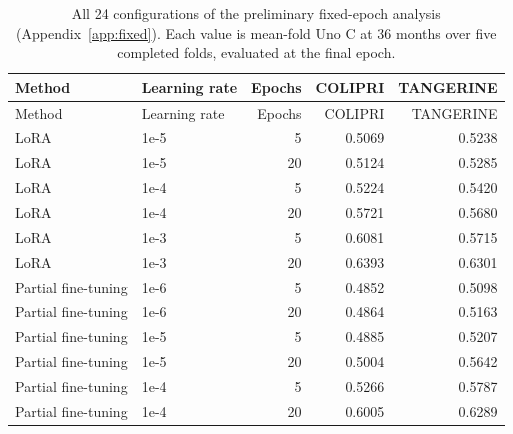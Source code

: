 \begin{longtable}{llrrr}
\caption{All 24 configurations of the preliminary fixed-epoch analysis (Appendix~\ref{app:fixed}). Each value is mean-fold Uno C at 36 months over five completed folds, evaluated at the final epoch.}\label{tab:phase3}\\
\toprule Method & Learning rate & Epochs & COLIPRI & TANGERINE \\ \midrule
\endfirsthead
\toprule Method & Learning rate & Epochs & COLIPRI & TANGERINE \\ \midrule
\endhead
LoRA & 1e-5 & 5 & 0.5069 & 0.5238 \\
LoRA & 1e-5 & 20 & 0.5124 & 0.5285 \\
LoRA & 1e-4 & 5 & 0.5224 & 0.5420 \\
LoRA & 1e-4 & 20 & 0.5721 & 0.5680 \\
LoRA & 1e-3 & 5 & 0.6081 & 0.5715 \\
LoRA & 1e-3 & 20 & 0.6393 & 0.6301 \\
Partial fine-tuning & 1e-6 & 5 & 0.4852 & 0.5098 \\
Partial fine-tuning & 1e-6 & 20 & 0.4864 & 0.5163 \\
Partial fine-tuning & 1e-5 & 5 & 0.4885 & 0.5207 \\
Partial fine-tuning & 1e-5 & 20 & 0.5004 & 0.5642 \\
Partial fine-tuning & 1e-4 & 5 & 0.5266 & 0.5787 \\
Partial fine-tuning & 1e-4 & 20 & 0.6005 & 0.6289 \\
\bottomrule
\end{longtable}
